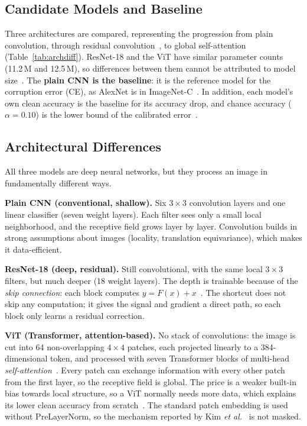 \documentclass[conference]{IEEEtran}
\begin{document}
\subsection{Candidate Models and Baseline}
Three architectures are compared, representing the progression from plain convolution, through residual convolution~\cite{he2016}, to global self-attention~\cite{dosovitskiy2021} (Table~\ref{tab:archdiff}). ResNet-18 and the ViT have similar parameter counts (11.2\,M and 12.5\,M), so differences between them cannot be attributed to model size~\cite{bai2021}. The \textbf{plain CNN is the baseline}: it is the reference model for the corruption error (CE), as AlexNet is in ImageNet-C~\cite{hendrycks2019}. In addition, each model's own clean accuracy is the baseline for its accuracy drop, and chance accuracy ($\alpha = 0.10$) is the lower bound of the calibrated error~\cite{liu2024}.

\subsection{Architectural Differences}
All three models are deep neural networks, but they process an image in fundamentally different ways.

\textbf{Plain CNN (conventional, shallow).} Six $3\times3$ convolution layers and one linear classifier (seven weight layers). Each filter sees only a small local neighborhood, and the receptive field grows layer by layer. Convolution builds in strong assumptions about images (locality, translation equivariance), which makes it data-efficient.

\textbf{ResNet-18 (deep, residual).} Still convolutional, with the same local $3\times3$ filters, but much deeper (18 weight layers). The depth is trainable because of the \emph{skip connection}: each block computes $y = F(x) + x$~\cite{he2016}. The shortcut does not skip any computation; it gives the signal and gradient a direct path, so each block only learns a residual correction.

\textbf{ViT (Transformer, attention-based).} No stack of convolutions: the image is cut into 64 non-overlapping $4\times4$ patches, each projected linearly to a 384-dimensional token, and processed with seven Transformer blocks of multi-head \emph{self-attention}~\cite{dosovitskiy2021}. Every patch can exchange information with every other patch from the first layer, so the receptive field is global. The price is a weaker built-in bias towards local structure, so a ViT normally needs more data, which explains its lower clean accuracy from scratch~\cite{kotyan2024}. The standard patch embedding is used without PreLayerNorm, so the mechanism reported by Kim \emph{et al.}~\cite{kim2023} is not masked.
\end{document}
